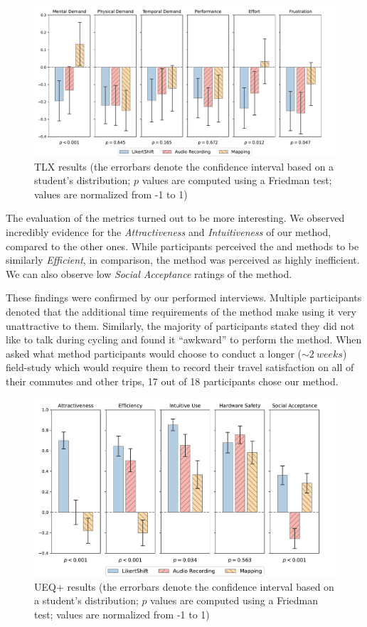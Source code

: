 \begin{figure}[!htb]
    \centering
    \includegraphics[height=0.5\linewidth]{../evaluation/eval_tlx.pdf}
    \caption{TLX results (the errorbars denote the confidence interval based on a student's distribution; $p$ values are computed using a Friedman test; values are normalized from -1 to 1)}
    \label{fig:eval_tlx}
\end{figure}

\bigbreak\noindent
The evaluation of the  metrics turned out to be more interesting.
We observed incredibly evidence for the \textit{Attractiveness} and \textit{Intuitiveness} of our \likertshift method, compared to the other ones.
While participants perceived the \likertshift and \audiorecording methods to be similarly \textit{Efficient}, in comparison, the \mapping method was perceived as highly inefficient.
We can also observe low \textit{Social Acceptance} ratings of the \audiorecording method.

These findings were confirmed by our performed interviews.
Multiple participants denoted that the additional time requirements of the \mapping method make using it very unattractive to them.
Similarly, the majority of participants stated they did not like to talk during cycling and found it “awkward” to perform the \audiorecording method.
When asked what method participants would choose to conduct a longer ($\sim\SI{2}{weeks}$) field-study which would require them to record their travel satisfaction on all of their commutes and other trips, 17 out of 18 participants chose our \likertshift method.

\begin{figure}[!htb]
    \centering
    \includegraphics[height=0.5\linewidth]{../evaluation/eval_ueq.pdf}
    \caption{UEQ+ results (the errorbars denote the confidence interval based on a student's distribution; $p$ values are computed using a Friedman test; values are normalized from -1 to 1)}
    \label{fig:eval_ueq}
\end{figure}
